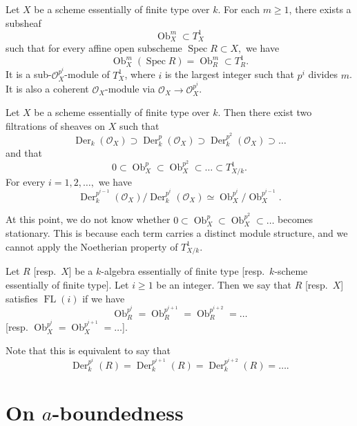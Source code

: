 \documentclass{amsart}
\newcommand{\FL}[1]{\operatorname{FL}(#1)}
\begin{document}
\begin{theorem}[{= \cite[Theorem 2.17]{miy2025}}]\label{Ob sheaf}
    Let $X$ be a scheme essentially of finite type over $k$. For each $m\ge 1$, there exists a subsheaf
    $$\operatorname{Ob}_X^{m}\subset T_X^1$$
    such that for every affine open subscheme $\operatorname{Spec}R\subset X,$ we have
    $$\operatorname{Ob}_X^{m}(\operatorname{Spec}R)=\operatorname{Ob}_R^m\subset T_R^1.$$ It is a sub-$\mathcal{O}_X^{p^i}$-module of $T_X^1$, where $i$ is the largest integer such that $p^i$ divides $m$. It is also a coherent $\mathcal{O}_X$-module via $\mathcal{O}_X\to \mathcal{O}_X^{p^i}$.
    
\end{theorem}

\begin{theorem}[{= \cite[Theorem 2.25]{miy2025}}]\label{duality}
Let $X$ be a scheme essentially of finite type over $k$. Then there exist two filtrations of sheaves on $X$ such that
$$\operatorname{Der}_k(\mathcal{O}_X)\supset\operatorname{Der}_k^p(\mathcal{O}_X)\supset\operatorname{Der}_k^{p^2}(\mathcal{O}_X)\supset\dots$$
and that
$$0\subset \operatorname{Ob}^p_X\subset\operatorname{Ob}^{p^2}_X\subset\dots\subset T^1_{X/k}.$$ For every $i=1,2,\dots,$ we have
$$\operatorname{Der}_k^{p^{i-1}}(\mathcal{O}_X)/\operatorname{Der}_k^{p^i}(\mathcal{O}_X)\simeq \operatorname{Ob}_X^{p^i}/\operatorname{Ob}_X^{p^{i-1}}. $$
\end{theorem}

At this point, we do not know whether $0\subset \operatorname{Ob}^p_X\subset\operatorname{Ob}^{p^2}_X\subset\dots$ becomes stationary. This is because each term carries a distinct module structure, and we cannot apply the Noetherian property of $T_{X/k}^1$.

\begin{definition}\label{FL def}
    Let $R$ [resp.\ $X$] be a $k$-algebra essentially of finite type [resp.\ $k$-scheme essentially of finite type]. Let $i\ge 1$ be an integer. Then we say that $R$ [resp.\ $X$] satisfies $\FL{i}$ if we have
    $$\operatorname{Ob}_R^{p^i}=\operatorname{Ob}_R^{p^{i+1}}=\operatorname{Ob}_R^{p^{i+2}}=\dots $$
    [resp. $\operatorname{Ob}_X^{p^i}=\operatorname{Ob}_X^{p^{i+1}}=\dots $].
\end{definition}

    Note that this is equivalent to say that $$\operatorname{Der}_k^{p^i}(R)=\operatorname{Der}_k^{p^{i+1}}(R)=\operatorname{Der}_k^{p^{i+2}}(R)=\dots.$$


\section{On $a$-boundedness}
\end{document}
